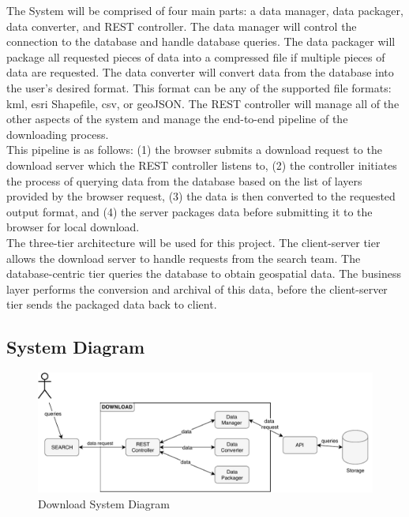 \documentclass{article}
\begin{document}
The System will be comprised of four main parts: a data manager, data packager, data converter, and REST controller. The data manager will control the connection to the database and handle database queries. The data packager will package all requested pieces of data into a compressed file if multiple pieces of data are requested. The data converter will convert data from the database into the user's desired format. This format can be any of the supported file formats: kml, esri Shapefile, csv, or geoJSON. The REST controller will manage all of the other aspects of the system and manage the end-to-end pipeline of the downloading process. \\

This pipeline is as follows: (1) the browser submits a download request to the download server which the REST controller listens to, (2) the controller initiates the process of querying data from the database based on the list of layers provided by the browser request, (3) the data is then converted to the requested output format, and (4) the server packages data before submitting it to the browser for local download. \\ 

The three-tier architecture will be used for this project. The client-server tier allows the download server to handle requests from the search team. The database-centric tier queries the database to obtain geospatial data. The business layer performs the conversion and archival of this data, before the client-server tier sends the packaged data back to client.   

\subsection{System Diagram}

\begin{figure}[H]
	\begin{center}
		\caption{Download System Diagram}
		\includegraphics[width=\textwidth]{images/component.pdf}
	\end{center}
\end{figure}
\end{document}
